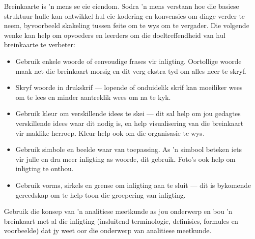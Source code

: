 
Breinkaarte is 'n mens se eie eiendom. Sodra 'n mens verstaan ​​hoe die
basiese struktuur hulle kan ontwikkel hul eie kodering en konvensies
om dinge verder te neem, byvoorbeeld skakeling tussen feite om te wys
om te vergader. Die volgende wenke kan help om opvoeders en leerders
om die doeltreffendheid van hul breinkaarte te verbeter:

\begin{itemize}[noitemsep]
\item
  Gebruik enkele woorde of eenvoudige frases vir inligting. Oortollige
  woorde maak net die breinkaart morsig en dit verg ekstra tyd om
  alles neer te skryf.
\item
Skryf woorde in drukskrif --- lopende of onduidelik skrif kan
moeiliker wees om te lees en minder aantreklik wees om na te kyk.
\item
  Gebruik kleur om verskillende idees te skei --- dit sal help om jou
  gedagtes verskillende idees waar dit nodig is, en help visualisering
  van die breinkaart vir maklike herroep. Kleur help ook om die
  organisasie te wys.
\item
  Gebruik simbole en beelde waar van toepassing. As 'n simbool beteken
  iets vir julle en dra meer inligting as woorde, dit gebruik. Foto's
  ook help om inligting te onthou.
\item
  Gebruik vorms, sirkels en grense om inligting aan te sluit --- dit
  is bykomende gereedskap om te help toon die groepering van
  inligting.
\end{itemize}
Gebruik die konsep van 'n analitiese meetkunde as jou onderwerp en
bou 'n breinkaart met al die inligting (insluitend terminologie,
definisies, formules en voorbeelde) dat jy weet oor die onderwerp van
analitiese meetkunde.

